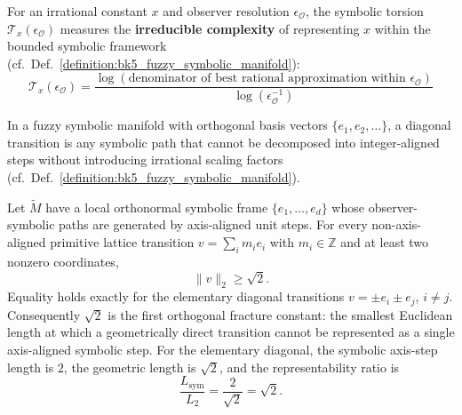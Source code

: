 \begin{definition}
\label{definition:bk5_symbolic_torsion}
For an irrational constant $x$ and observer resolution $\epsilon_\mathcal{O}$, the symbolic torsion $\mathcal{T}_x(\epsilon_\mathcal{O})$ measures the \textbf{irreducible complexity} of representing $x$ within the bounded symbolic framework (cf.~Def.~\ref{definition:bk5_fuzzy_symbolic_manifold}):
$$\mathcal{T}_x(\epsilon_\mathcal{O}) = \frac{\log(\text{denominator of best rational approximation within } \epsilon_\mathcal{O})}{\log(\epsilon_\mathcal{O}^{-1})}$$
\end{definition}

\begin{definition}
\label{definition:bk5_diagonal_transition}
In a fuzzy symbolic manifold with orthogonal basis vectors $\{e_1, e_2, \ldots\}$, a diagonal transition is any symbolic path that cannot be decomposed into integer-aligned steps without introducing irrational scaling factors (cf.~Def.~\ref{definition:bk5_fuzzy_symbolic_manifold}).
\end{definition}

\begin{theorem}
\label{theorem:bk5_sqrt2_maximal_fracture}
Let $\tilde{M}$ have a local orthonormal symbolic frame
$\{e_1,\ldots,e_d\}$ whose observer-symbolic paths are generated by
axis-aligned unit steps.  For every non-axis-aligned primitive lattice
transition $v=\sum_i m_i e_i$ with $m_i\in\mathbb{Z}$ and at least two nonzero
coordinates,
\[
\|v\|_2\geq \sqrt{2}.
\]
Equality holds exactly for the elementary diagonal transitions
$v=\pm e_i\pm e_j$, $i\neq j$.  Consequently $\sqrt{2}$ is the first
orthogonal fracture constant: the smallest Euclidean length at which a
geometrically direct transition cannot be represented as a single
axis-aligned symbolic step.  For the elementary diagonal, the symbolic
axis-step length is $2$, the geometric length is $\sqrt{2}$, and the
representability ratio is
\[
\frac{L_{\mathrm{sym}}}{L_2}=\frac{2}{\sqrt{2}}=\sqrt{2}.
\]
\end{theorem}

